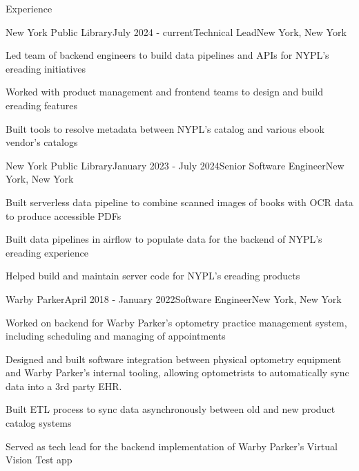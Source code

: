 \documentclass{resume} %
\begin{document}

\begin{rSection}{Experience}

 \begin{rSubsection}{New York Public Library}{July 2024 - current}{Technical Lead}{New York, New York}
\item Led team of backend engineers to build data pipelines and APIs for NYPL's ereading initiatives
\item Worked with product management and frontend teams to design and build ereading features
\item Built tools to resolve metadata between NYPL's catalog and various ebook vendor's catalogs
\end{rSubsection}

\begin{rSubsection}{New York Public Library}{January 2023 - July 2024}{Senior Software Engineer}{New York, New York}
\item Built serverless data pipeline to combine scanned images of books with OCR data to produce accessible PDFs
\item Built data pipelines in airflow to populate data for the backend of NYPL's ereading experience
\item Helped build and maintain server code for NYPL's ereading products
\end{rSubsection}

\begin{rSubsection}{Warby Parker}{April 2018 - January 2022}{Software Engineer}{New York, New York}
\item Worked on backend for Warby Parker's optometry practice management system, including scheduling and managing of appointments
\item Designed and built software integration between physical optometry equipment and Warby Parker's internal tooling, allowing optometrists to automatically sync data into a 3rd party EHR.
\item Built ETL process to sync data asynchronously between old and new product catalog systems
\item Served as tech lead for the backend implementation of Warby Parker's Virtual Vision Test app
\end{rSubsection}



\end{rSection}
\end{document}
